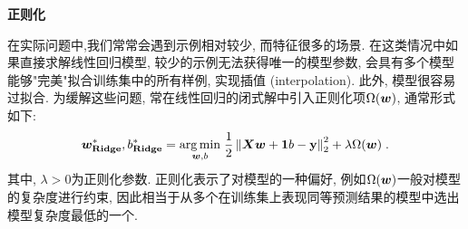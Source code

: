 \documentclass[answers]{exam}  %
\begin{document}
\begin{questions}
	\question [25] \textbf{正则化}

	在实际问题中,我们常常会遇到示例相对较少, 而特征很多的场景. 在这类情况中如果直接求解线性回归模型, 较少的示例无法获得唯一的模型参数, 会具有多个模型能够"完美"拟合训练集中的所有样例, 实现插值 (interpolation). 此外, 模型很容易过拟合. 为缓解这些问题, 常在线性回归的闭式解中引入正则化项$\Omega(\boldsymbol{w})$, 通常形式如下:
	\begin{equation}
		\boldsymbol{w}_{\mathbf{Ridge}}^{*}, b_{\mathbf{Ridge}}^{*}=\underset{\boldsymbol{w}, b}{\arg \min }\; \frac{1}{2}\left\|\boldsymbol{X} \boldsymbol{w}+\boldsymbol{1} b-\mathbf{y}\right\|_{2}^{2}+\lambda \Omega(\boldsymbol{w})  \label{eq:ls-regular}\;.
	\end{equation}
	其中, $\lambda > 0$为正则化参数. 正则化表示了对模型的一种偏好, 例如$\Omega(\boldsymbol{w})$一般对模型的复杂度进行约束, 因此相当于从多个在训练集上表现同等预测结果的模型中选出模型复杂度最低的一个.


\end{questions}
\end{document}
